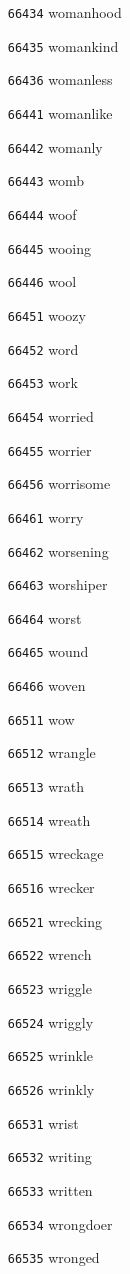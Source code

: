 \documentclass[twoside,11pt]{article}
\begin{document}
\begin{multicols}{5}
\begin{enumerate}
\item[\texttt{66434}] womanhood
\item[\texttt{66435}] womankind
\item[\texttt{66436}] womanless
\item[\texttt{66441}] womanlike
\item[\texttt{66442}] womanly
\item[\texttt{66443}] womb
\item[\texttt{66444}] woof
\item[\texttt{66445}] wooing
\item[\texttt{66446}] wool
\item[\texttt{66451}] woozy
\item[\texttt{66452}] word
\item[\texttt{66453}] work
\item[\texttt{66454}] worried
\item[\texttt{66455}] worrier
\item[\texttt{66456}] worrisome
\item[\texttt{66461}] worry
\item[\texttt{66462}] worsening
\item[\texttt{66463}] worshiper
\item[\texttt{66464}] worst
\item[\texttt{66465}] wound
\item[\texttt{66466}] woven
\item[\texttt{66511}] wow
\item[\texttt{66512}] wrangle
\item[\texttt{66513}] wrath
\item[\texttt{66514}] wreath
\item[\texttt{66515}] wreckage
\item[\texttt{66516}] wrecker
\item[\texttt{66521}] wrecking
\item[\texttt{66522}] wrench
\item[\texttt{66523}] wriggle
\item[\texttt{66524}] wriggly
\item[\texttt{66525}] wrinkle
\item[\texttt{66526}] wrinkly
\item[\texttt{66531}] wrist
\item[\texttt{66532}] writing
\item[\texttt{66533}] written
\item[\texttt{66534}] wrongdoer
\item[\texttt{66535}] wronged

\end{enumerate}
\end{multicols}
\end{document}

